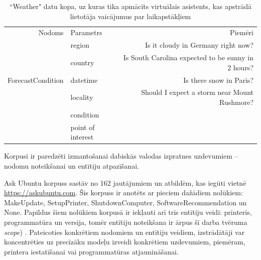 \begin{table}[htbp]
    \centering
    \caption{``Weather" datu kopa, uz kuras tika apmācīts virtuālais asistents, kas apstrādā lietotāja vaicājumus par laikapstākļiem  \cite{snips-2018}}
    \begin{tabular}{rlr}
        Nodoms            & Parametrs                                           & Piemēri                                                                                                                                            \\
        & \textcolor[rgb]{ .439,  .188,  .627}{ region}           & Is it \textcolor[rgb]{ 1,  .753,  0}{cloudy} in \textcolor[rgb]{ 1,  0,  0}{Germany} \textcolor[rgb]{ .573,  .816,  .314}{ right now}?                         \\
        & \textcolor[rgb]{ 1,  0,  0}{ country}                   & Is \textcolor[rgb]{ .439,  .188,  .627}{South Carolina} expected to be \textcolor[rgb]{ 1,  .753,  0}{sunny} \textcolor[rgb]{ .573,  .816,  .314}{in 2 hours}? \\
        ForecastCondition & \textcolor[rgb]{ .573,  .816,  .314}{ datetime}         & Is there \textcolor[rgb]{ 1,  .753,  0}{snow} in \textcolor[rgb]{ 0,  .69,  .941}{Paris}?                                                                  \\
        & \textcolor[rgb]{ 0,  .69,  .941}{ locality}             & Should I expect a \textcolor[rgb]{ 1,  .753,  0}{storm} near \textcolor[rgb]{ .929,  .49,  .192}{Mount Rushmore}?                                          \\
        & \textcolor[rgb]{ 1,  .753,  0}{ condition}              &                                                                                                                                                    \\
        & \textcolor[rgb]{ .929,  .49,  .192}{ point of interest} &                                                                                                                                                    \\
    \end{tabular}%
    \label{tab:slots}%
\end{table}%


Korpusi ir paredzēti izmantošanai dabiskās valodas izpratnes uzdevumiem -- nodomu noteikšanai un entītiju atpazīšanai.

Ask Ubuntu korpuss sastāv no 162 jautājumiem un atbildēm, kas iegūti vietnē \url{https://askubuntu.com}. Šis korpuss ir anotēts ar pieciem dažādiem nolūkiem: MakeUpdate, SetupPrinter, ShutdownComputer, SoftwareRecommendation un None. Papildus šiem nolūkiem korpusā ir iekļauti arī trīs entītiju veidi: printeris, programmatūra un versija, tomēr entītiju noteikšana ir ārpus šī darba tvēruma \textit{scope}) \cite{braun-2017}. Pateicoties konkrētiem nodomiem un entītiju veidiem, izstrādātāji var koncentrēties uz precīzāku modeļu izveidi konkrētiem uzdevumiem, piemēram, printera iestatīšanai vai programmatūras atjaunināšanai.

